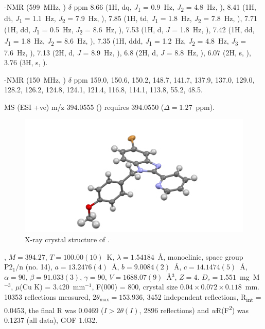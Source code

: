 \begin{refsection}
\begin{enumerate}
    -NMR (599~MHz, ) $\delta$ ppm 
    8.66 (1H, dq, \textit{J}\textsubscript{1} = 0.9~Hz, \textit{J}\textsubscript{2} = 4.8~Hz, ), 
    8.41 (1H, dt, \textit{J}\textsubscript{1} = 1.1~Hz, \textit{J}\textsubscript{2} = 7.9~Hz, ), 
    7.85 (1H, td, \textit{J}\textsubscript{1} = 1.8~Hz, \textit{J}\textsubscript{2} = 7.8~Hz, ), 
    7.71 (1H, dd, \textit{J}\textsubscript{1} = 0.5~Hz, \textit{J}\textsubscript{2} = 8.6~Hz, ), 
    7.53 (1H, d, \textit{J} = 1.8~Hz, ), 
    7.42 (1H, dd, \textit{J}\textsubscript{1} = 1.8~Hz, \textit{J}\textsubscript{2} = 8.6~Hz, ), 
    7.35 (1H, ddd, \textit{J}\textsubscript{1} = 1.2~Hz, \textit{J}\textsubscript{2} = 4.8~Hz, \textit{J}\textsubscript{3} = 7.6~Hz, ), 
    7.13 (2H, d, \textit{J} = 8.9~Hz, ), 
    6.8 (2H, d, \textit{J} = 8.8~Hz, ), 
    6.07 (2H, s, ), 
    3.76 (3H, s, ).

    -NMR (150~MHz, ) $\delta$ ppm 159.0, 150.6, 150.2, 148.7, 141.7, 137.9, 137.0, 129.0, 128.2, 126.2, 124.8, 124.1, 121.4, 116.8, 114.1, 113.8, 55.2, 48.5.
    
\end{enumerate}

MS (ESI +ve) m/z 394.0555 ()  requires 394.0550 ($\Delta=1.27$~ppm).

\begin{figure}
    \includegraphics[width=0.8\linewidth]{Figures/rhs-bromo-2py-pmb-xtal.pdf}
    \caption{X-ray crystal structure of .}
\end{figure}

, $M=394.27$, $T=100.00(10)$~K, $\lambda=1.54184$~\AA, monoclinic, space group $\text{P}2_1/\text{n}$ (no. 14), $a = 13.2476(4)$~\AA, $b = 9.0084(2)$~\AA, $c = 14.1474(5)$~\AA, $\alpha = 90$\degree, $\beta = 91.033(3)$\degree, $\gamma = 90$\degree, $V = 1688.07(9)$~\AA$^{3}$, $Z = 4$. $D_{c}= 1.551$~mg~M$^{-3}$, $\mu$(Cu K\a) = 3.420~mm$^{-1}$, F(000) = 800, crystal size $0.04 \times 0.072 \times 0.118$~mm. 10353 reflections measured, $2\theta_{\max}=153.936$\degree, 3452 independent reflections, R\textsubscript{int} = 0.0453, the final R was 0.0469 ($I > 2\theta(I)$, 2896 reflections) and \emph{w}R(F\textsuperscript{2}) was 0.1237 (all data), GOF 1.032. 


\end{refsection}
